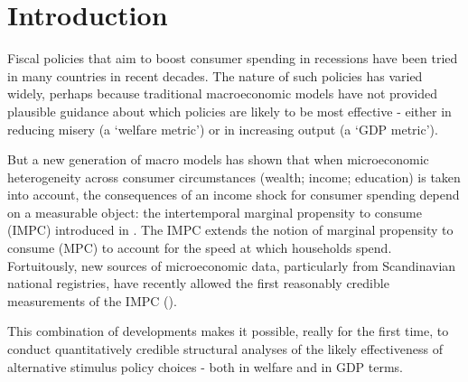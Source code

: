 \documentclass[\econtexRoot/HAFiscal]{subfiles}
\begin{document}
\hypertarget{introduction}{}\par\section{Introduction}\notinsubfile{\label{sec:intro}}
\setcounter{page}{0}

Fiscal policies that aim to boost consumer spending in recessions have been tried in many countries in recent decades.  The nature of such policies has varied widely, perhaps because traditional macroeconomic models have not provided plausible guidance about which policies are likely to be most effective - either in reducing misery (a `welfare metric') or in increasing output (a `GDP metric').

But a new generation of macro models has shown that when microeconomic heterogeneity across consumer circumstances (wealth; income; education) is taken into account, the consequences of an income shock for consumer spending depend on a measurable object: the intertemporal marginal propensity to consume (IMPC) introduced in \cite{auclert2018IKC}.  The IMPC extends the notion of marginal propensity to consume (MPC) to account for the speed at which households spend.  Fortuitously, new sources of microeconomic data, particularly from Scandinavian national registries, have recently allowed the first reasonably credible measurements of the IMPC (\cite{fagereng_mpc_2021}).

This combination of developments makes it possible, really for the first time, to conduct quantitatively credible structural analyses of the likely effectiveness of alternative stimulus policy choices - both in welfare and in GDP terms.
\end{document}
